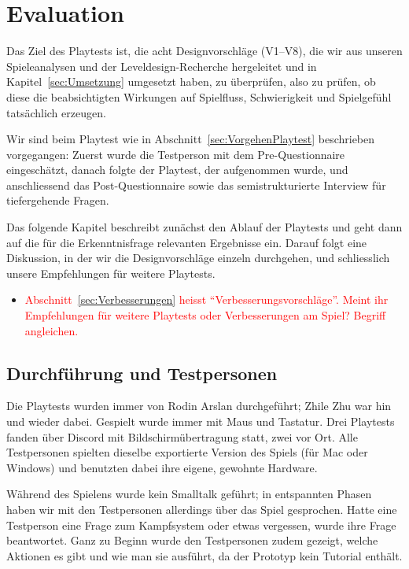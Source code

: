 \documentclass[../Main.tex]{subfiles}
\begin{document}
\section{Evaluation} \label{sec:Evaluation}

Das Ziel des Playtests ist, die acht Designvorschläge (V1--V8), die wir aus unseren Spieleanalysen und der Leveldesign-Recherche hergeleitet und in Kapitel~\ref{sec:Umsetzung} umgesetzt haben, zu überprüfen, also zu prüfen, ob diese die beabsichtigten Wirkungen auf Spielfluss, Schwierigkeit und Spielgefühl tatsächlich erzeugen.

Wir sind beim Playtest wie in Abschnitt~\ref{sec:VorgehenPlaytest} beschrieben vorgegangen: Zuerst wurde die Testperson mit dem Pre-Questionnaire eingeschätzt, danach folgte der Playtest, der aufgenommen wurde, und anschliessend das Post-Questionnaire sowie das semistrukturierte Interview für tiefergehende Fragen.

Das folgende Kapitel beschreibt zunächst den Ablauf der Playtests und geht dann auf die für die Erkenntnisfrage relevanten Ergebnisse ein. Darauf folgt eine Diskussion, in der wir die Designvorschläge einzeln durchgehen, und schliesslich unsere Empfehlungen für weitere Playtests.

\begin{itemize}[leftmargin=1.5cm]
    \item \textcolor{red}{Abschnitt~\ref{sec:Verbesserungen} heisst \enquote{Verbesserungsvorschläge}. Meint ihr Empfehlungen für weitere Playtests oder Verbesserungen am Spiel? Begriff angleichen.}
\end{itemize}

\subsection{Durchführung und Testpersonen} \label{sec:Durchfuehrung}

Die Playtests wurden immer von Rodin Arslan durchgeführt; Zhile Zhu war hin und wieder dabei. Gespielt wurde immer mit Maus und Tastatur. Drei Playtests fanden über Discord mit Bildschirmübertragung statt, zwei vor Ort. Alle Testpersonen spielten dieselbe exportierte Version des Spiels (für Mac oder Windows) und benutzten dabei ihre eigene, gewohnte Hardware.

Während des Spielens wurde kein Smalltalk geführt; in entspannten Phasen haben wir mit den Testpersonen allerdings über das Spiel gesprochen. Hatte eine Testperson eine Frage zum Kampfsystem oder etwas vergessen, wurde ihre Frage beantwortet. Ganz zu Beginn wurde den Testpersonen zudem gezeigt, welche Aktionen es gibt und wie man sie ausführt, da der Prototyp kein Tutorial enthält.
\end{document}
